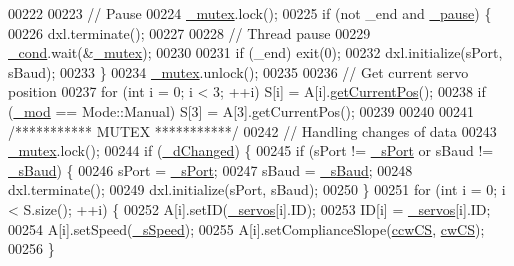 \begin{DoxyCode}
00222         
00223         \textcolor{comment}{// Pause}
00224         \hyperlink{a00009_a6327eafc0dac189ec1b202d63ef32457}{\_mutex}.lock();
00225         \textcolor{keywordflow}{if} (not \_end and \hyperlink{a00009_aaf2ef80e8e43518b75d20a5102970d2e}{\_pause}) \{
00226             dxl.terminate();
00227             
00228             \textcolor{comment}{// Thread pause}
00229             \hyperlink{a00009_afcb93c09acd7fecf47d92996a297365c}{\_cond}.wait(&\hyperlink{a00009_a6327eafc0dac189ec1b202d63ef32457}{\_mutex});
00230             
00231             \textcolor{keywordflow}{if} (\_end) exit(0);
00232             dxl.initialize(sPort, sBaud);
00233         \}
00234         \hyperlink{a00009_a6327eafc0dac189ec1b202d63ef32457}{\_mutex}.unlock();
00235         
00236         \textcolor{comment}{// Get current servo position}
00237         \textcolor{keywordflow}{for} (\textcolor{keywordtype}{int} i = 0; i < 3; ++i) S[i] = A[i].\hyperlink{a00009_a19ad0fe74d9f35220bf2864dbcecce2a}{getCurrentPos}();
00238         \textcolor{keywordflow}{if} (\hyperlink{a00009_acdecea1688594d3ab7386a6db97dd90d}{\_mod} == Mode::Manual) S[3] = A[3].getCurrentPos();
00239         
00240         
00241         \textcolor{comment}{/*********** MUTEX ***********/}
00242         \textcolor{comment}{// Handling changes of data}
00243         \hyperlink{a00009_a6327eafc0dac189ec1b202d63ef32457}{\_mutex}.lock();
00244         \textcolor{keywordflow}{if} (\hyperlink{a00009_a2b6ccfeacbb3cc9ac5c34549b9aa3f11}{\_dChanged}) \{
00245             \textcolor{keywordflow}{if} (sPort != \hyperlink{a00009_ac9a614aa1518efb49b0a06636bd1bdbf}{\_sPort} or sBaud != \hyperlink{a00009_a5b9a41b9e271275b914affb0a845a2ee}{\_sBaud}) \{
00246                 sPort = \hyperlink{a00009_ac9a614aa1518efb49b0a06636bd1bdbf}{\_sPort};
00247                 sBaud = \hyperlink{a00009_a5b9a41b9e271275b914affb0a845a2ee}{\_sBaud};
00248                 dxl.terminate();
00249                 dxl.initialize(sPort, sBaud);
00250             \}
00251             \textcolor{keywordflow}{for} (\textcolor{keywordtype}{int} i = 0; i < S.size(); ++i) \{
00252                 A[i].setID(\hyperlink{a00009_a1ac6662fe6d198b5971ae0ffa7ddfcfd}{\_servos}[i].ID);
00253                 ID[i] = \hyperlink{a00009_a1ac6662fe6d198b5971ae0ffa7ddfcfd}{\_servos}[i].ID;
00254                 A[i].setSpeed(\hyperlink{a00009_a2591c704c80518be7abb1698364cab5e}{\_sSpeed});
00255                 A[i].setComplianceSlope(\hyperlink{a00009_ac2d1087cd0cc45ef71c77aa20b41ceda}{ccwCS}, \hyperlink{a00009_a67b2528edcaa375aefa1fb4117576665}{cwCS});
00256             \}

\end{DoxyCode}
